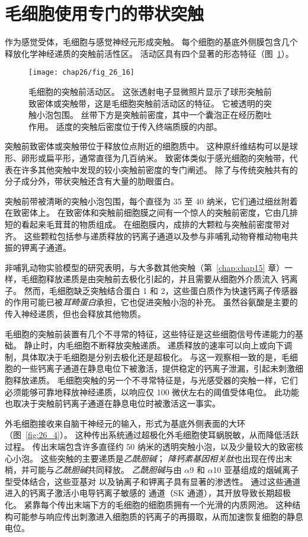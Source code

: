 \section{毛细胞使用专门的带状突触}

作为感觉受体，毛细胞与感觉神经元形成突触。
每个细胞的基底外侧膜包含几个释放化学神经递质的突触前活性区。
活动区具有四个显著的形态特征（图~\ref{fig:26_16}）。


\begin{figure}[htbp]
	\centering
	\texttt{[image: chap26/fig\_26\_16]}
	\caption{毛细胞的突触前活动区。
		这张透射电子显微照片显示了球形突触前致密体或突触带，这是毛细胞突触前活动区的特征。
		它被透明的突触小泡包围。
		丝带下方是突触前密度，其中一个囊泡正在经历胞吐作用。
		适度的突触后密度位于传入终端质膜的内部。 }
	\label{fig:26_16}
\end{figure}


突触前致密体或突触带位于释放位点附近的细胞质中。
这种原纤维结构可以是球形、卵形或扁平形，通常直径为几百纳米。
致密体类似于感光细胞的突触带，代表在许多其他突触中发现的较小突触前密度的专门阐述。
除了与传统突触共有的分子成分外，带状突触还含有大量的肋眼蛋白。


突触前带被清晰的突触小泡包围，每个直径为 35 至 40 纳米，它们通过细丝附着在致密体上。
在致密体和突触前细胞膜之间有一个惊人的突触前密度，它由几排短的看起来毛茸茸的物质组成。
在细胞膜内，成排的大颗粒与突触前密度带对齐。
这些颗粒包括参与递质释放的钙离子通道以及参与非哺乳动物脊椎动物电共振的钾离子通道。


非哺乳动物实验模型的研究表明，与大多数其他突触（第~\ref{chap:chap15} 章）一样，毛细胞释放递质是由突触前去极化引起的，并且需要从细胞外介质流入 钙离子。
然而，毛细胞缺乏突触结合蛋白 1 和 2，这些蛋白质作为快速钙离子传感器的作用可能已被\textit{耳畸蛋白}承担，它也促进突触小泡的补充。
虽然谷氨酸是主要的传入神经递质，但也会释放其他物质。


毛细胞的突触前装置有几个不寻常的特征，这些特征是这些细胞信号传递能力的基础。
静止时，内毛细胞不断释放突触递质。
递质释放的速率可以向上或向下调制，具体取决于毛细胞是分别去极化还是超极化。
与这一观察相一致的是，毛细胞的一些钙离子通道在静息电位下被激活，提供稳定的钙离子泄漏，引起未刺激细胞释放递质。
毛细胞突触的另一个不寻常特征是，与光感受器的突触一样，它们必须能够可靠地释放神经递质，以响应仅 100 微伏左右的阈值受体电位。
此功能也取决于突触前钙离子通道在静息电位时被激活这一事实。


外毛细胞接收来自脑干神经元的输入，形式为基底外侧表面的大环（图~\ref{fig:26_4}）。
这种传出系统通过超极化外毛细胞使耳蜗脱敏，从而降低活跃过程。
传出末端包含许多直径约 50 纳米的透明突触小泡，以及少量较大的致密核心小泡。
这些突触的主要递质是\textit{乙酰胆碱}；
\textit{降钙素基因相关肽}也出现在传出末梢，并可能与\textit{乙酰胆碱}共同释放。
\textit{乙酰胆碱}与由 $\alpha$9 和 $\alpha$10 亚基组成的烟碱离子型受体结合，这些亚基对  以及钠离子和钾离子具有显著的渗透性。
通过这些通道进入的钙离子激活小电导钙离子敏感的  通道（SK 通道），其开放导致长期超极化。
紧靠每个传出末端下方的毛细胞的细胞质拥有一个光滑的内质网池。
这种结构可能参与响应传出刺激进入细胞质的钙离子的再摄取，从而加速恢复细胞的静息电位。



